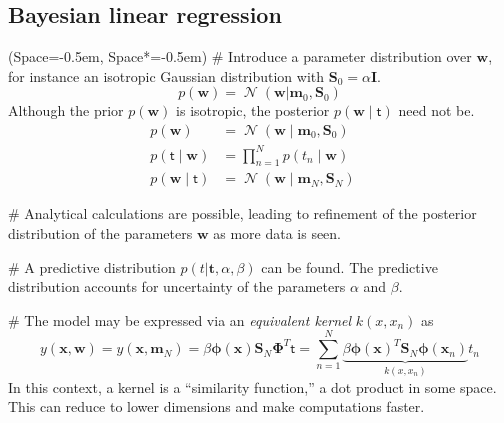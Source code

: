 \documentclass[12pt, a4paper]{article}
\newcommand{\listSpace}{-0.5em}%
\newcommand{\vect}[1]{\bm{#1}}
\DeclareMathOperator{\N}{\mathcal{N}}
\begin{document}
\subsection*{Bayesian linear regression}
\begin{easylist}[itemize]
	\ListProperties(Space=\listSpace, Space*=\listSpace)
	# Introduce a parameter distribution over $\vect{w}$, for instance an isotropic Gaussian distribution with $\vect{S}_0 = \alpha \vect{I}$.
	\begin{equation*}
	p(\vect{w}) = \N (\vect{w} | \vect{m}_0, \vect{S}_0)
	\end{equation*}
	Although the prior $p(\vect{w})$ is isotropic, the posterior $p(\vect{w} \mid \mathsf{t})$ need not be.
	\begin{align*}
	    p(\vect{w}) &= \N ( \vect{w} \mid \vect{m}_0, \vect{S}_0) \quad \tag{prior} \\
	    p(\mathsf{t}\mid \vect{w}) &= \prod_{n=1}^{N} p(t_n \mid \vect{w}) \quad \tag{likelihood} \\
	    p(\vect{w} \mid \mathsf{t}) &= \N ( \vect{w} \mid \vect{m}_N, \vect{S}_N) \quad \tag{posterior} 
	\end{align*}
	
	# Analytical calculations are possible, leading to refinement of the posterior distribution of the parameters $\vect{w}$ as more data is seen.
	
	# A predictive distribution $p(t | \vect{t}, \alpha, \beta)$ can be found.
	The predictive distribution accounts for uncertainty of the parameters $\alpha$ and $\beta$.
	
	# The model may be expressed via an \emph{equivalent kernel} $k(x, x_n)$ as 
	\begin{equation*}
		y(\vect{x}, \vect{w}) =
		y(\vect{x}, \vect{m}_N) =
		\beta \vect{\phi} (\vect{x}) \vect{S}_N \vect{\Phi}^T \mathsf{t}
		=
		\sum_{n=1}^{N} \underbrace{
			\beta \vect{\phi} (\vect{x})^T \vect{S}_N \vect{\phi} (\vect{x}_n)
			}_{k(x, x_n)}
			t_n
	\end{equation*}
	In this context, a kernel is a ``similarity function,'' a dot product in some space.
	This can reduce to lower dimensions and make computations faster.
\end{easylist}
\end{document}
